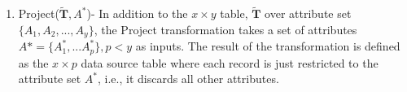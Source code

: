 {\begin{enumerate}
	
	\item \textsf{Project}($\tilde{\mathbf{T}},A^*$)- In addition to the $ x \times y$ table, $\tilde{\mathbf{T}}$ over attribute set $\{A_1, A_2, ..., A_y\}$, the \textsf{Project} transformation takes a set of attributes $A*=\{A^*_1,...A^*_p\}, p < y$ as inputs. The result of the transformation is defined as the $x \times p$ data source table where each record is just restricted to the attribute set $A^*$, i.e., it discards all other attributes. 
   

\end{enumerate}}
